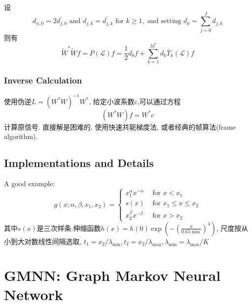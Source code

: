 \documentclass{article}
\begin{document}
    设
    \begin{equation}
        d_{n, 0}=2 d_{j, 0}^{\prime} \text { and } d_{j, k}=d_{j, k}^{\prime} \text { for } k \geqslant 1, \text { and setting } d_{k}=\sum_{j=0}^{J} d_{j, k}
    \end{equation}
    则有
    \begin{equation}
        \tilde{W}^{*} \tilde{W} f=P(\mathcal{L}) f=\frac{1}{2} d_{0} f+\sum_{k=1}^{M^{*}} d_{k} \bar{T}_{k}(\mathcal{L}) f
    \end{equation}

\subsubsection{Inverse Calculation}

    使用伪逆$L=\left(W^{*} W\right)^{-1} W^{*}$, 给定小波系数c,可以通过方程
    \begin{equation}
        \left(W^{*} W\right) f=W^{*} c
    \end{equation}
    计算原信号. 直接解是困难的, 使用快速共轭梯度法, 或者经典的帧算法(frame algorithm).

\subsection{Implementations and Details}

    A good example:
    \begin{equation}
        g\left(x ; \alpha, \beta, x_{1}, x_{2}\right)=\left\{\begin{array}{ll}
        x_{1}^{\alpha} x^{-\alpha} & \text { for } x<x_{1} \\
        s(x) & \text { for } x_{1} \leqslant x \leqslant x_{2} \\
        x_{2}^{\beta} x^{-\beta} & \text { for } x>x_{2}
        \end{array}\right.
    \end{equation}
    其中$s(x)$是三次样条.伸缩函数$h(x)=h(0)\exp \left(-\left(\frac{x}{0.6 \lambda \min }\right)^{4}\right)$, 尺度按从小到大对数线性间隔选取, $t_{1}=x_{2} / \lambda_{\min },t_{I}=x_{2} / \lambda_{\max }, \lambda_{\min } = \lambda_{\max }/K $
    
\section{GMNN: Graph Markov Neural Network}

\end{document}
